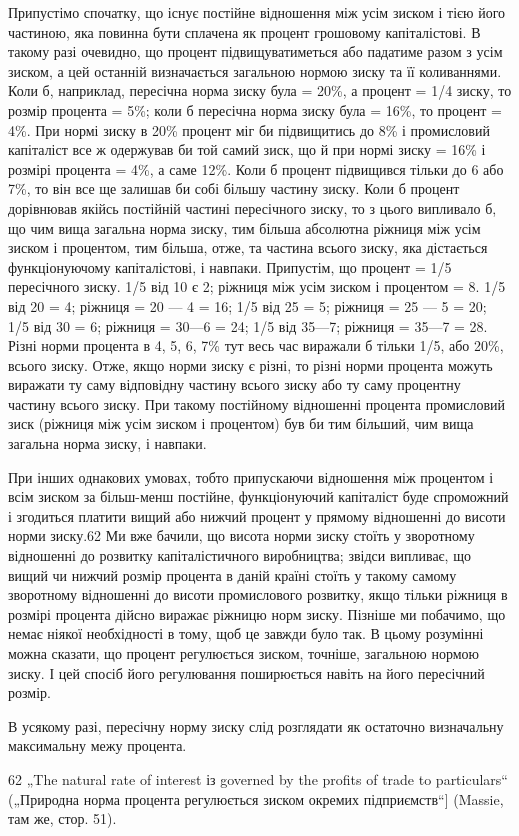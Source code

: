 Припустімо спочатку, що існує постійне відношення між усім
зиском і тією його частиною, яка повинна бути сплачена як процент
грошовому капіталістові. В такому разі очевидно, що процент
підвищуватиметься або падатиме разом з усім зиском, а цей
останній визначається загальною нормою зиску та її коливаннями.
Коли б, наприклад, пересічна норма зиску була = 20\%, а процент
= 1/4 зиску, то розмір процента = 5\%; коли б пересічна
норма зиску була = 16\%, то процент = 4\%. При нормі зиску в
20\% процент міг би підвищитись до 8\% і промисловий капіталіст
все ж одержував би той самий зиск, що й при нормі зиску
= 16\% і розмірі процента = 4\%, а саме 12\%. Коли б процент
підвищився тільки до 6 або 7\%, то він все ще залишав би собі
більшу частину зиску. Коли б процент дорівнював якійсь постійній
частині пересічного зиску, то з цього випливало б, що
чим вища загальна норма зиску, тим більша абсолютна ріжниця
між усім зиском і процентом, тим більша, отже, та частина
всього зиску, яка дістається функціонуючому капіталістові, і навпаки.
Припустім, що процент = 1/5 пересічного зиску. 1/5 від 10
є 2; ріжниця між усім зиском і процентом = 8. 1/5 від 20 = 4;
ріжниця = 20 — 4 = 16; 1/5 від 25 = 5; ріжниця = 25 — 5 = 20; 1/5 від
30 = 6; ріжниця = 30—6 = 24; 1/5 від 35—7; ріжниця = 35—7 = 28.
Різні норми процента в 4, 5, 6, 7\% тут весь час виражали б
тільки 1/5, або 20\%, всього зиску. Отже, якщо норми зиску є різні,
то різні норми процента можуть виражати ту саму відповідну
частину всього зиску або ту саму процентну частину всього
зиску. При такому постійному відношенні процента промисловий
зиск (ріжниця між усім зиском і процентом) був би тим більший,
чим вища загальна норма зиску, і навпаки.

При інших однакових умовах, тобто припускаючи відношення
між процентом і всім зиском за більш-менш постійне, функціонуючий
капіталіст буде спроможний і згодиться платити вищий
або нижчий процент у прямому відношенні до висоти норми
зиску.62 Ми вже бачили, що висота норми зиску стоїть у зворотному
відношенні до розвитку капіталістичного виробництва;
звідси випливає, що вищий чи нижчий розмір процента в даній
країні стоїть у такому самому зворотному відношенні до висоти
промислового розвитку, якщо тільки ріжниця в розмірі
процента дійсно виражає ріжницю норм зиску. Пізніше ми побачимо,
що немає ніякої необхідності в тому, щоб це завжди
було так. В цьому розумінні можна сказати, що процент регулюється
зиском, точніше, загальною нормою зиску. І цей спосіб
його регулювання поширюється навіть на його пересічний розмір.

В усякому разі, пересічну норму зиску слід розглядати як
остаточно визначальну максимальну межу процента.

62 „The natural rate of interest із governed by the profits of trade to particulars“
(„Природна норма процента регулюється зиском окремих підприємств“]
(Massie, там же, стор. 51).
